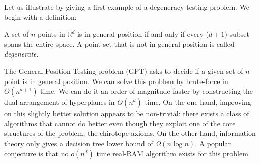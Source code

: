 Let us illustrate by giving a first example of a degeneracy testing problem. We
begin with a definition:

\begin{definition}
A set of \(n\) points in \(\mathbb{R}^d\)
is in general position if and only if every (\(d+1\))-subset spans the entire
space. A point set that is not in general position is called \emph{degenerate}.
\end{definition}

The General Position Testing problem (GPT) asks to decide if a given set of
\(n\) point is in general position. We can solve this problem by brute-force in
\(O(n^{d+1})\) time.
We can do it an order of magnitude faster
by constructing the dual arrangement of hyperplanes in
\(O(n^d)\) time.
On the one hand,
improving on this slightly better solution appears to be non-trivial: there
exists a class of algorithms that cannot do better even though they
exploit one of the core structures of the problem, the chirotope axioms.
On the other hand, information theory only gives a decision tree
lower bound of \(\Omega(n \log n)\).
A popular conjecture is that no \(o(n^d)\) time real-RAM
algorithm exists for this problem.
